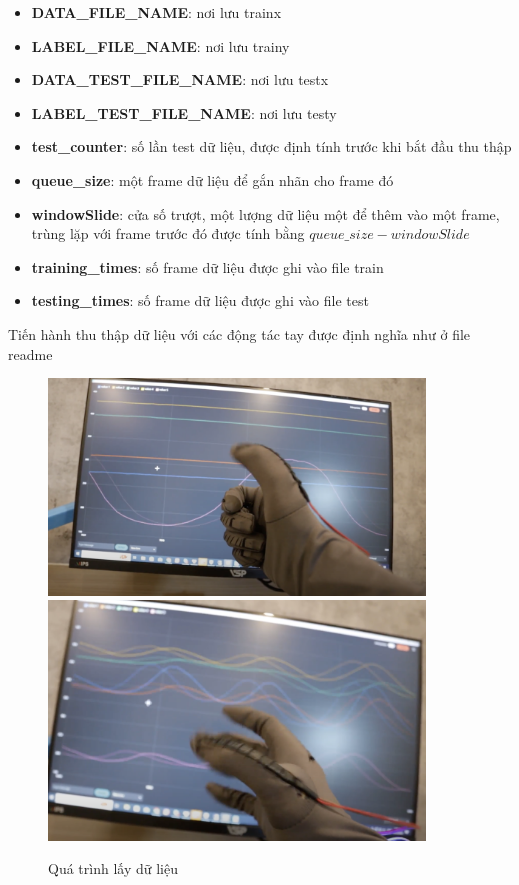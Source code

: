 \begin{itemize}
\item\textbf{DATA\_FILE\_NAME}: nơi lưu trainx\\
\item\textbf{LABEL\_FILE\_NAME}: nơi lưu trainy\\
\item\textbf{DATA\_TEST\_FILE\_NAME}: nơi lưu testx\\
\item\textbf{LABEL\_TEST\_FILE\_NAME}: nơi lưu testy\\
\item\textbf{test\_counter}: số lần test dữ liệu, được định tính trước khi bắt đầu thu thập \\
\item\textbf{queue\_size}: một frame dữ liệu để gắn nhãn cho frame đó\\
\item\textbf{windowSlide}: cửa số trượt, một lượng dữ liệu một để thêm vào một frame, trùng lặp với frame trước đó được tính bằng $queue\_size - windowSlide$
\item\textbf{training\_times}: số frame dữ liệu được ghi vào file train
\item\textbf{testing\_times}: số frame dữ liệu được ghi vào file test
\end{itemize}

Tiến hành thu thập dữ liệu với các động tác tay được định nghĩa như ở file readme
\begin{figure}[H]
    \centering
    \includegraphics[width=10cm]{Images/SystemImpl/readdt_result_1.png}
    \centering
    \includegraphics[width=10cm]{Images/SystemImpl/readdt_result_2.png}
\caption{Quá trình lấy dữ liệu}
\end{figure}


